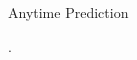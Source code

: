 \documentclass[final,t]{beamer}
\begin{document}
\begin{frame}{}
\begin{columns}[t]
\begin{column}{.47\linewidth}
\begin{exampleblock}{Anytime Prediction}
    \end{exampleblock}

    
    

   
   
    .\\\vspace{10cm}
    
  \footnotesize
  
\end{column}
\vspace{0pt}




\end{columns}
\end{frame}
\end{document}
